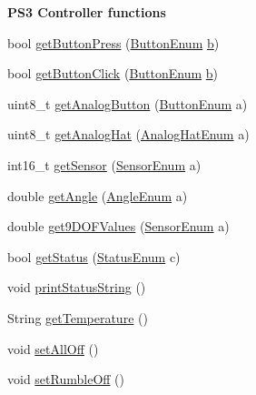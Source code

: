 \begin{Indent}{\bf \-P\-S3 \-Controller functions}\par
\begin{DoxyCompactItemize}
\item 
bool \hyperlink{class_p_s3_b_t_a5e7842bef25e7c7210974f5405e1bc81}{get\-Button\-Press} (\hyperlink{controller_enums_8h_a94f7389d205c78830a5441370d7870fd}{\-Button\-Enum} \hyperlink{_p_s4_parser_8h_a4313c9563516f94387762ab05763456b}{b})
\item 
bool \hyperlink{class_p_s3_b_t_a3b0e522b5d8a39d3daf540e4feb4f5fe}{get\-Button\-Click} (\hyperlink{controller_enums_8h_a94f7389d205c78830a5441370d7870fd}{\-Button\-Enum} \hyperlink{_p_s4_parser_8h_a4313c9563516f94387762ab05763456b}{b})
\item 
uint8\-\_\-t \hyperlink{class_p_s3_b_t_a6dac11972fc4b1f5984d43365be1a954}{get\-Analog\-Button} (\hyperlink{controller_enums_8h_a94f7389d205c78830a5441370d7870fd}{\-Button\-Enum} a)
\item 
uint8\-\_\-t \hyperlink{class_p_s3_b_t_a648e2bfeb06e2dc1603202e95324b206}{get\-Analog\-Hat} (\hyperlink{controller_enums_8h_a34dad8f0a0927471137c403216597093}{\-Analog\-Hat\-Enum} a)
\item 
int16\-\_\-t \hyperlink{class_p_s3_b_t_a07c8dcb809005e8492bbef4e1f4b9d24}{get\-Sensor} (\hyperlink{controller_enums_8h_a00d5030559c481763282483889597d51}{\-Sensor\-Enum} a)
\item 
double \hyperlink{class_p_s3_b_t_ae1e00364c5ff214274438bf54c3cf743}{get\-Angle} (\hyperlink{controller_enums_8h_a7c7824a10a9ffa8fea85602fcf4d84e6}{\-Angle\-Enum} a)
\item 
double \hyperlink{class_p_s3_b_t_ae6596ca28c65db105392a9fed8698ef2}{get9\-D\-O\-F\-Values} (\hyperlink{controller_enums_8h_a00d5030559c481763282483889597d51}{\-Sensor\-Enum} a)
\item 
bool \hyperlink{class_p_s3_b_t_a5062acbd19a52d88a998f19060fbc46a}{get\-Status} (\hyperlink{_p_s3_enums_8h_add5c7a32e8138b44244caf07232161ae}{\-Status\-Enum} c)
\item 
void \hyperlink{class_p_s3_b_t_a8f3945da5c4e00ce2fd3daf0b6267cec}{print\-Status\-String} ()
\item 
\-String \hyperlink{class_p_s3_b_t_ab4f49b61167df001d13b68c7699651b4}{get\-Temperature} ()
\item 
void \hyperlink{class_p_s3_b_t_a6ee74242b0c1644496ff04b457f39cd2}{set\-All\-Off} ()
\item 
void \hyperlink{class_p_s3_b_t_a5c87e7db5311a5d56f78c994b5545e4e}{set\-Rumble\-Off} ()

\end{DoxyCompactItemize}
\end{Indent}
